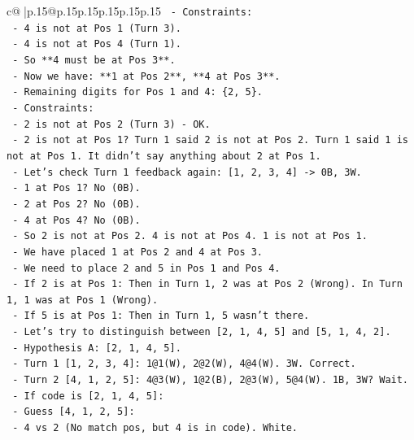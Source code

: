 \documentclass{article}
\begin{document}
{\begin{supertabular}{c@{$\;$}|p{.15\linewidth}@{}p{.15\linewidth}p{.15\linewidth}p{.15\linewidth}p{.15\linewidth}p{.15\linewidth}}
{{{\texttt{  {-} Constraints:} \\
\texttt{    {-} 4 is not at Pos 1 (Turn 3).} \\
\texttt{    {-} 4 is not at Pos 4 (Turn 1).} \\
\texttt{    {-} So **4 must be at Pos 3**.} \\
\texttt{  {-} Now we have: **1 at Pos 2**, **4 at Pos 3**.} \\
\texttt{  {-} Remaining digits for Pos 1 and 4: \{2, 5\}.} \\
\texttt{  {-} Constraints:} \\
\texttt{    {-} 2 is not at Pos 2 (Turn 3) {-} OK.} \\
\texttt{    {-} 2 is not at Pos 1? Turn 1 said 2 is not at Pos 2. Turn 1 said 1 is not at Pos 1. It didn't say anything about 2 at Pos 1.} \\
\texttt{    {-} Let's check Turn 1 feedback again: {[}1, 2, 3, 4{]} {-}> 0B, 3W.} \\
\texttt{      {-} 1 at Pos 1? No (0B).} \\
\texttt{      {-} 2 at Pos 2? No (0B).} \\
\texttt{      {-} 4 at Pos 4? No (0B).} \\
\texttt{      {-} So 2 is not at Pos 2. 4 is not at Pos 4. 1 is not at Pos 1.} \\
\texttt{    {-} We have placed 1 at Pos 2 and 4 at Pos 3.} \\
\texttt{    {-} We need to place 2 and 5 in Pos 1 and Pos 4.} \\
\texttt{    {-} If 2 is at Pos 1: Then in Turn 1, 2 was at Pos 2 (Wrong). In Turn 1, 1 was at Pos 1 (Wrong).} \\
\texttt{    {-} If 5 is at Pos 1: Then in Turn 1, 5 wasn't there.} \\
\texttt{    {-} Let's try to distinguish between {[}2, 1, 4, 5{]} and {[}5, 1, 4, 2{]}.} \\
\texttt{    {-} Hypothesis A: {[}2, 1, 4, 5{]}.} \\
\texttt{      {-} Turn 1 {[}1, 2, 3, 4{]}: 1@1(W), 2@2(W), 4@4(W). 3W. Correct.} \\
\texttt{      {-} Turn 2 {[}4, 1, 2, 5{]}: 4@3(W), 1@2(B), 2@3(W), 5@4(W). 1B, 3W? Wait.} \\
\texttt{        {-} If code is {[}2, 1, 4, 5{]}:} \\
\texttt{        {-} Guess {[}4, 1, 2, 5{]}:} \\
\texttt{          {-} 4 vs 2 (No match pos, but 4 is in code). White.} \\
}}}
\end{supertabular}}
\end{document}
